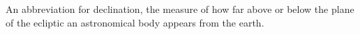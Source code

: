 An abbreviation for declination, the measure of how far above or below
the plane of the ecliptic an astronomical body appears from the earth.